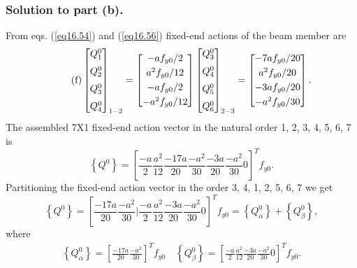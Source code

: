 \documentclass{AeroStructure-ERJohnson}
\begin{document}
\begin{example*}
\subsubsection{Solution to part (b).} From eqs. (\ref{eq16.54}) and (\ref{eq16.56}) fixed-end actions of the beam member are
\begin{align}\label{eq16.7f}\tag{f}
\left[\begin{array}{@{}l@{}}Q_{1}^{0} \\[6pt]Q_{2}^{0} \\[6pt]Q_{3}^{0} \\[6pt]Q_{4}^{0}\end{array}\right]_{1-2}=\left[\begin{array}{@{}c@{}}-a f_{y 0} / 2 \\[3pt]a^{2} f_{y 0} / 12 \\[3pt]-a f_{y 0} / 2 \\[3pt]-a^{2} f_{y 0} / 12\end{array}\right]\left[\begin{array}{@{}l@{}}Q_{3}^{0} \\[6pt]Q_{4}^{0} \\[6pt]Q_{5}^{0} \\[6pt]Q_{6}^{0}\end{array}\right]_{2-3}=\left[\begin{array}{@{}c@{}}-7 a f_{y 0} / 20 \\[3pt]a^{2} f_{y 0} / 20 \\[3pt]-3 a f_{y 0} / 20 \\[3pt]-a^{2} f_{y 0} / 30\end{array}\right].
\end{align}
The assembled 7X1 fixed-end action vector in the natural order 1, 2, 3, 4, 5, 6, 7 is
\[
\left\{Q^{0}\right\}=\left[\frac{-a}{2} \frac{a^{2}}{12} \frac{-17 a}{20} \frac{-a^{2}}{30} \frac{-3 a}{20} \frac{-a^{2}}{30} 0\right]^{T} f_{y 0}.
\]
Partitioning the fixed-end action vector in the order 3, 4, 1, 2, 5, 6, 7 we get
\[
\left\{Q^{0}\right\}=\left[\frac{-17 a}{20} \frac{-a^{2}}{30} \bigg| \frac{-a}{2} \frac{a^{2}}{12} \frac{-3 a}{20} \frac{-a^{2}}{30} 0\right]^{T} f_{y 0}=\left\{Q_{\alpha}^{0}\right\}+\left\{Q_{\beta}^{0}\right\},
\]
where
\begin{align}\label{eq16.7g}\tag{g}
\left\{Q_{\alpha}^{0}\right\}=\left[\frac{-17 a}{20} \frac{-a^{2}}{30}\right]^{T} f_{y 0} \quad\left\{Q_{\beta}^{0}\right\}=\left[\frac{-a}{2} \frac{a^{2}}{12} \frac{-3 a}{20} \frac{-a^{2}}{30} 0\right]^{T} f_{y 0}.
\end{align}


\end{example*}
\end{document}
